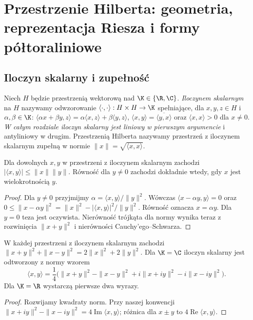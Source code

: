\setcounter{section}{12}
\section{Przestrzenie Hilberta: geometria, reprezentacja Riesza i formy półtoraliniowe}
\label{sec:hilbert13}

\subsection{Iloczyn skalarny i zupełność}

\begin{definicja}
\label{def:iloczyn-skalarny13}
Niech $H$ będzie przestrzenią wektorową nad $\K\in\{\R,\C\}$.
\emph{Iloczynem skalarnym} na $H$ nazywamy odwzorowanie
$\langle\cdot,\cdot\rangle:H\times H\to\K$ spełniające, dla
$x,y,z\in H$ i $\alpha,\beta\in\K$:
$\langle\alpha x+\beta y,z\rangle=\alpha\langle x,z\rangle+
\beta\langle y,z\rangle$,
$\langle x,y\rangle=\overline{\langle y,x\rangle}$ oraz
$\langle x,x\rangle>0$ dla $x\ne0$.
\emph{W całym rozdziale iloczyn skalarny jest liniowy w pierwszym
argumencie} i antyliniowy w drugim. Przestrzenią Hilberta nazywamy
przestrzeń z iloczynem skalarnym zupełną w normie
$\|x\|=\sqrt{\langle x,x\rangle}$.
\end{definicja}

\begin{lemat}
\label{lem:cs13}
Dla dowolnych $x,y$ w przestrzeni z iloczynem skalarnym zachodzi
$|\langle x,y\rangle|\le\|x\|\|y\|$.
Równość dla $y\ne0$ zachodzi dokładnie wtedy, gdy $x$ jest
wielokrotnością $y$.
\end{lemat}
\begin{proof}
Dla $y\ne0$ przyjmijmy $\alpha=\langle x,y\rangle/\|y\|^2$.
Wówczas $\langle x-\alpha y,y\rangle=0$ oraz
$0\le\|x-\alpha y\|^2=\|x\|^2-|\langle x,y\rangle|^2/\|y\|^2$.
Równość oznacza $x=\alpha y$. Dla $y=0$ teza jest oczywista.
Nierówność trójkąta dla normy wynika teraz z rozwinięcia
$\|x+y\|^2$ i nierówności Cauchy'ego--Schwarza.
\end{proof}

\begin{stwierdzenie}
\label{prop:parallelogram13}
W każdej przestrzeni z iloczynem skalarnym zachodzi
$\|x+y\|^2+\|x-y\|^2=2\|x\|^2+2\|y\|^2$.
Dla $\K=\C$ iloczyn skalarny jest odtworzony z normy wzorem
\[
\langle x,y\rangle=\frac14\bigl(\|x+y\|^2-\|x-y\|^2
+i\|x+iy\|^2-i\|x-iy\|^2\bigr).
\]
Dla $\K=\R$ wystarczą pierwsze dwa wyrazy.
\end{stwierdzenie}
\begin{proof}
Rozwijamy kwadraty norm. Przy naszej konwencji
$\|x+iy\|^2-\|x-iy\|^2=4\operatorname{Im}\langle x,y\rangle$;
różnica dla $x\pm y$ to $4\operatorname{Re}\langle x,y\rangle$.
\end{proof}

